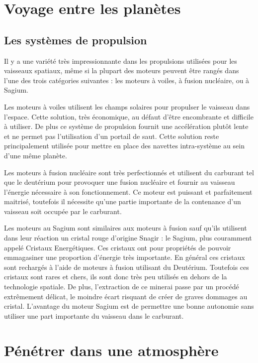\begin{multicols}{2}

\section{Voyage entre les planètes}

\subsection{Les systèmes de propulsion}

Il y a une variété très impressionnante dans les propulsions utilisées pour les vaisseaux spatiaux, même si la plupart des moteurs peuvent être rangés dans l’une des trois catégories suivantes : les moteurs à voiles, à fusion nucléaire, ou à Sagium.

Les moteurs à voiles utilisent les champs solaires pour propulser le vaisseau dans l’espace. Cette solution, très économique, au défaut d’être encombrante et difficile à utiliser. De plus ce système de propulsion fournit une accélération plutôt lente et ne permet pas l’utilisation d’un portail de saut. Cette solution reste principalement utilisée pour mettre en place des navettes intra-système au sein d’une même planète.

Les moteurs à fusion nucléaire sont très perfectionnés et utilisent du carburant tel que le deutérium pour provoquer une fusion nucléaire et fournir au vaisseau l’énergie nécessaire à son fonctionnement. Ce moteur est puissant et parfaitement maitrisé, toutefois il nécessite qu’une partie importante de la contenance d’un vaisseau soit occupée par le carburant.

Les moteurs au Sagium sont similaires aux moteurs à fusion sauf qu’ils utilisent dans leur réaction un cristal rouge d’origine Snagir : le Sagium,  plus couramment appelé Cristaux Energétiques. Ces cristaux ont pour propriétés de pouvoir emmagasiner une proportion d’énergie très importante. En général ces cristaux sont rechargés à l’aide de moteurs à fusion utilisant du Deutérium. Toutefois ces cristaux sont rares et chers, ils sont donc très peu utilisés en dehors de la technologie spatiale. De plus, l’extraction de ce minerai passe par un procédé extrêmement délicat, le moindre écart risquant de créer de graves dommages au cristal. L’avantage du moteur Sagium est de permettre une bonne autonomie sans utiliser une part importante du vaisseau dans le carburant.

\section{Pénétrer dans une atmosphère}


\end{multicols}
